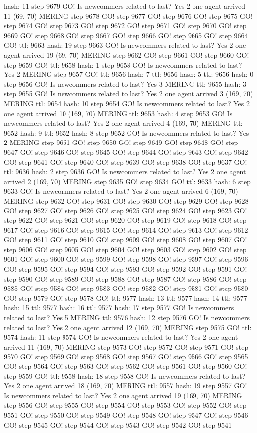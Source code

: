 hash: 11 step 9679 GO! Is newcommers related to last? Yes 2 one agent arrived 11 (69, 70) MERING step 9678 GO! step 9677 GO! step 9676 GO! step 9675 GO! step 9674 GO! step 9673 GO! step 9672 GO! step 9671 GO! step 9670 GO! step 9669 GO! step 9668 GO! step 9667 GO! step 9666 GO! step 9665 GO! step 9664 GO! ttl: 9663 hash: 19 step 9663 GO! Is newcommers related to last? Yes 2 one agent arrived 19 (69, 70) MERING step 9662 GO! step 9661 GO! step 9660 GO! step 9659 GO! ttl: 9658 hash: 1 step 9658 GO! Is newcommers related to last? Yes 2 MERING step 9657 GO! ttl: 9656 hash: 7 ttl: 9656 hash: 5 ttl: 9656 hash: 0 step 9656 GO! Is newcommers related to last? Yes 3 MERING ttl: 9655 hash: 3 step 9655 GO! Is newcommers related to last? Yes 2 one agent arrived 3 (169, 70) MERING ttl: 9654 hash: 10 step 9654 GO! Is newcommers related to last? Yes 2 one agent arrived 10 (169, 70) MERING ttl: 9653 hash: 4 step 9653 GO! Is newcommers related to last? Yes 2 one agent arrived 4 (169, 70) MERING ttl: 9652 hash: 9 ttl: 9652 hash: 8 step 9652 GO! Is newcommers related to last? Yes 2 MERING step 9651 GO! step 9650 GO! step 9649 GO! step 9648 GO! step 9647 GO! step 9646 GO! step 9645 GO! step 9644 GO! step 9643 GO! step 9642 GO! step 9641 GO! step 9640 GO! step 9639 GO! step 9638 GO! step 9637 GO! ttl: 9636 hash: 2 step 9636 GO! Is newcommers related to last? Yes 2 one agent arrived 2 (169, 70) MERING step 9635 GO! step 9634 GO! ttl: 9633 hash: 6 step 9633 GO! Is newcommers related to last? Yes 2 one agent arrived 6 (169, 70) MERING step 9632 GO! step 9631 GO! step 9630 GO! step 9629 GO! step 9628 GO! step 9627 GO! step 9626 GO! step 9625 GO! step 9624 GO! step 9623 GO! step 9622 GO! step 9621 GO! step 9620 GO! step 9619 GO! step 9618 GO! step 9617 GO! step 9616 GO! step 9615 GO! step 9614 GO! step 9613 GO! step 9612 GO! step 9611 GO! step 9610 GO! step 9609 GO! step 9608 GO! step 9607 GO! step 9606 GO! step 9605 GO! step 9604 GO! step 9603 GO! step 9602 GO! step 9601 GO! step 9600 GO! step 9599 GO! step 9598 GO! step 9597 GO! step 9596 GO! step 9595 GO! step 9594 GO! step 9593 GO! step 9592 GO! step 9591 GO! step 9590 GO! step 9589 GO! step 9588 GO! step 9587 GO! step 9586 GO! step 9585 GO! step 9584 GO! step 9583 GO! step 9582 GO! step 9581 GO! step 9580 GO! step 9579 GO! step 9578 GO! ttl: 9577 hash: 13 ttl: 9577 hash: 14 ttl: 9577 hash: 15 ttl: 9577 hash: 16 ttl: 9577 hash: 17 step 9577 GO! Is newcommers related to last? Yes 5 MERING ttl: 9576 hash: 12 step 9576 GO! Is newcommers related to last? Yes 2 one agent arrived 12 (169, 70) MERING step 9575 GO! ttl: 9574 hash: 11 step 9574 GO! Is newcommers related to last? Yes 2 one agent arrived 11 (169, 70) MERING step 9573 GO! step 9572 GO! step 9571 GO! step 9570 GO! step 9569 GO! step 9568 GO! step 9567 GO! step 9566 GO! step 9565 GO! step 9564 GO! step 9563 GO! step 9562 GO! step 9561 GO! step 9560 GO! step 9559 GO! ttl: 9558 hash: 18 step 9558 GO! Is newcommers related to last? Yes 2 one agent arrived 18 (169, 70) MERING ttl: 9557 hash: 19 step 9557 GO! Is newcommers related to last? Yes 2 one agent arrived 19 (169, 70) MERING step 9556 GO! step 9555 GO! step 9554 GO! step 9553 GO! step 9552 GO! step 9551 GO! step 9550 GO! step 9549 GO! step 9548 GO! step 9547 GO! step 9546 GO! step 9545 GO! step 9544 GO! step 9543 GO! step 9542 GO! step 9541 